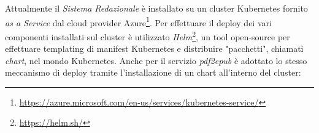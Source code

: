 Attualmente il \textit{Sistema Redazionale} è installato su un cluster Kubernetes fornito \textit{as a Service} dal cloud provider Azure\footnote{\url{https://azure.microsoft.com/en-us/services/kubernetes-service/}}. Per effettuare il deploy dei vari componenti installati sul cluster è utilizzato \textit{Helm}\footnote{\url{https://helm.sh/}}, un tool open-source per effettuare templating di manifest Kubernetes e distribuire "pacchetti", chiamati \textit{chart}, nel mondo Kubernetes. Anche per il servizio \textit{pdf2epub} è adottato lo stesso meccanismo di deploy tramite l'installazione di un chart all'interno del cluster:
